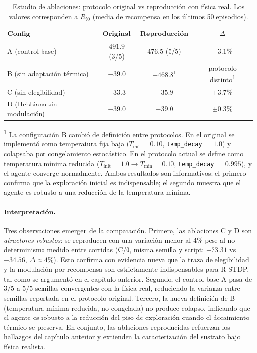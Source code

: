 \begin{table}[H]
\centering
\caption{Estudio de ablaciones: protocolo original vs reproducción con
física real. Los valores corresponden a $\bar{R}_{50}$ (media de recompensa
en los últimos 50 episodios).}
\label{tab:ablaciones}
\begin{tabular}{lccc}
\hline
\textbf{Config} & \textbf{Original} & \textbf{Reproducción} & \textbf{$\Delta$} \\
\hline
A (control base)            & $491.9$ (3/5) & $476.5$ (5/5) & $-3.1\%$ \\
B (sin adaptación térmica)  & $-39.0$       & $+468.8$\textsuperscript{1} & protocolo distinto\textsuperscript{1} \\
C (sin elegibilidad)        & $-33.3$       & $-35.9$       & $+3.7\%$ \\
D (Hebbiano sin modulación)   & $-39.0$        & $-39.0$        & $\pm 0.3\%$ \\
\hline
\end{tabular}

\vspace{0.2cm}
{\footnotesize \textsuperscript{1} La configuración B cambió de definición
entre protocolos. En el original se implementó como temperatura fija baja
($T_{\text{init}} = 0.10$, \texttt{temp\_decay} $= 1.0$) y colapsaba por
congelamiento estocástico. En el protocolo actual se define como temperatura
mínima reducida ($T_{\text{init}} = 1.0 \to T_{\min} = 0.10$,
\texttt{temp\_decay} $= 0.995$), y el agente converge normalmente. Ambos
resultados son informativos: el primero confirma que la exploración inicial
es indispensable; el segundo muestra que el agente es robusto a una
reducción de la temperatura mínima.}
\end{table}

\paragraph{Interpretación.} Tres observaciones emergen de la comparación.
Primero, las ablaciones C y D son \emph{atractores robustos}: se reproducen
con una variación menor al $4\%$ pese al no-determinismo medido entre
corridas (C/0, misma semilla y script: $-33.31$ vs $-34.56$, $\Delta \approx
4\%$). Esto confirma con evidencia nueva que la traza de elegibilidad y la
modulación por recompensa son estrictamente indispensables para R-STDP, tal
como se argumentó en el capítulo anterior. Segundo, el control base A
pasa de $3/5$ a $5/5$ semillas convergentes con la física real, reduciendo
la varianza entre semillas reportada en el protocolo original. Tercero, la
nueva definición de B (temperatura mínima reducida, no congelada) no
produce colapso, indicando que el agente es robusto a la reducción del piso
de exploración cuando el decaimiento térmico se preserva. En conjunto, las
ablaciones reproducidas refuerzan los hallazgos del
capítulo anterior y extienden la caracterización del sustrato bajo
física realista.

